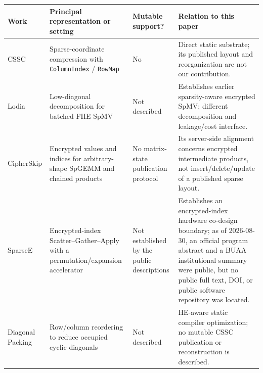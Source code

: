 {\small{} %
\begin{longtable}[]{@{}
  >{\raggedright\arraybackslash}p{}
  >{\raggedright\arraybackslash}p{}
  >{\raggedleft\arraybackslash}p{}
  >{\raggedright\arraybackslash}p{}@{}}
\toprule\noalign{}
\begin{minipage}[b]{\linewidth}\raggedright
Work
\end{minipage} & \begin{minipage}[b]{\linewidth}\raggedright
Principal representation or setting
\end{minipage} & \begin{minipage}[b]{\linewidth}\raggedleft
Mutable support?
\end{minipage} & \begin{minipage}[b]{\linewidth}\raggedright
Relation to this paper
\end{minipage} \\
\midrule\noalign{}
\endhead
\bottomrule\noalign{}
\endlastfoot
CSSC \cite{gao2026cssc} & Sparse-coordinate compression with \texttt{ColumnIndex} / \texttt{RowMap} & No & Direct static substrate; its published layout and reorganization are not our contribution. \\
Lodia \cite{yu2025lodia} & Low-diagonal decomposition for batched FHE SpMV & Not described & Establishes earlier sparsity-aware encrypted SpMV; different decomposition and leakage/cost interface. \\
CipherSkip \cite{xiong2026cipherskip} & Encrypted values and indices for arbitrary-shape SpGEMM and chained products & No matrix-state publication protocol & Its server-side alignment concerns encrypted intermediate products, not insert/delete/update of a published sparse layout. \\
SparseE \cite{wei2026sparsee} & Encrypted-index Scatter--Gather--Apply with a permutation/expansion accelerator & Not established by the public descriptions & Establishes an encrypted-index hardware co-design boundary; as of 2026-08-30, an official program abstract and a BUAA institutional summary were public, but no public full text, DOI, or public software repository was located. \\
Diagonal Packing \cite{mutluergil2026diagonal} & Row/column reordering to reduce occupied cyclic diagonals & Not described & HE-aware static compiler optimization; no mutable CSSC publication or reconstruction is described. \\

\end{longtable}}
